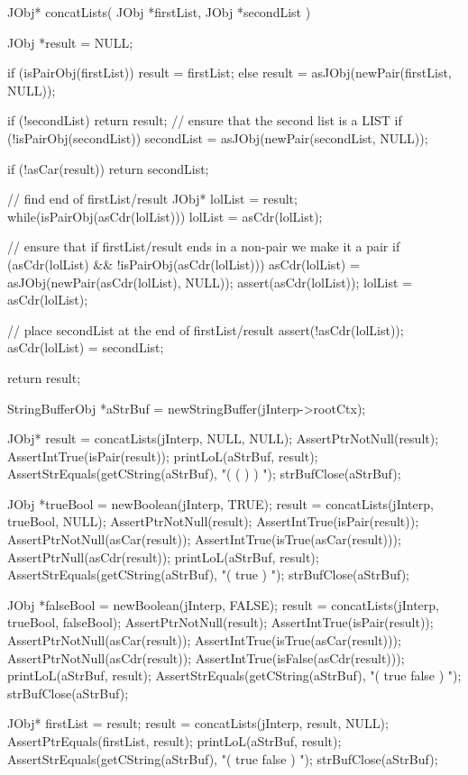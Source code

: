 \startCCode
JObj* concatLists(
  JObj *firstList,
  JObj *secondList
) {
  JObj *result = NULL;
 
  if (isPairObj(firstList)) {
    result = firstList;
  } else {
    result = asJObj(newPair(firstList, NULL));
  }
 
  if (!secondList) return result;
  // ensure that the second list is a LIST
  if (!isPairObj(secondList)) {
    secondList = asJObj(newPair(secondList, NULL));
  }

  if (!asCar(result)) return secondList;
 
  // find end of firstList/result
  JObj* lolList = result;
  while(isPairObj(asCdr(lolList))) {
    lolList = asCdr(lolList);
  }

  // ensure that if firstList/result ends in a non-pair we make it a pair
  if (asCdr(lolList) && !isPairObj(asCdr(lolList))) {
    asCdr(lolList) = asJObj(newPair(asCdr(lolList), NULL));
    assert(asCdr(lolList));
    lolList = asCdr(lolList);
  }

  // place secondList at the end of firstList/result
  assert(!asCdr(lolList));
  asCdr(lolList) = secondList;
 
  return result;
}
\stopCCode

\startCTest
  StringBufferObj *aStrBuf = newStringBuffer(jInterp->rootCtx);
  
  JObj* result = concatLists(jInterp, NULL, NULL);
  AssertPtrNotNull(result);
  AssertIntTrue(isPair(result));
  printLoL(aStrBuf, result);
  AssertStrEquals(getCString(aStrBuf), "( ( ) ) ");
  strBufClose(aStrBuf);
  
  JObj *trueBool  = newBoolean(jInterp, TRUE);
  result = concatLists(jInterp, trueBool, NULL);
  AssertPtrNotNull(result);
  AssertIntTrue(isPair(result));
  AssertPtrNotNull(asCar(result));
  AssertIntTrue(isTrue(asCar(result)));
  AssertPtrNull(asCdr(result));
  printLoL(aStrBuf, result);
  AssertStrEquals(getCString(aStrBuf), "( true ) ");
  strBufClose(aStrBuf);
  
  JObj *falseBool = newBoolean(jInterp, FALSE);
  result = concatLists(jInterp, trueBool, falseBool);
  AssertPtrNotNull(result);
  AssertIntTrue(isPair(result));
  AssertPtrNotNull(asCar(result));
  AssertIntTrue(isTrue(asCar(result)));
  AssertPtrNotNull(asCdr(result));
  AssertIntTrue(isFalse(asCdr(result)));
  printLoL(aStrBuf, result);
  AssertStrEquals(getCString(aStrBuf), "( true false ) ");
  strBufClose(aStrBuf);
  
  JObj* firstList = result;
  result = concatLists(jInterp, result, NULL);
  AssertPtrEquals(firstList, result);
  printLoL(aStrBuf, result);
  AssertStrEquals(getCString(aStrBuf), "( true false ) ");
  strBufClose(aStrBuf);
  
